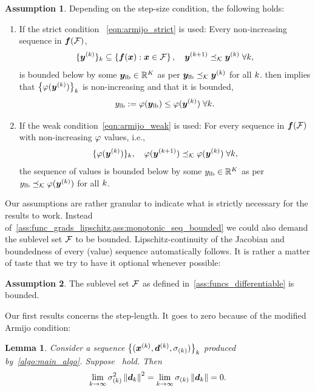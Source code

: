 \documentclass{article}
\theoremstyle{plain}
\newtheorem{lemma}[theorem]{Lemma}
\theoremstyle{definition}
\newtheorem{assumption}{Assumption}
\begin{document}
\begin{assumption}\label{ass:monotonic_seq_bounded}
	Depending on the step-size condition, the following holds:
	\begin{enumerate}
		\item 
			If the strict condition ~\eqref{eqn:armijo_strict} is used:
			Every non-increasing sequence in $\bm{f}(\mathcal F)$,
			$$
			\{\bm{y}^{(k)}\}_{k} \subseteq \left\{\bm{f}(\bm{x}): \bm{x}\in \mathcal F\right\},
			\quad \bm{y}^{(k+1)} \preceq_\mathcal K \bm{y}^{(k)} \;\forall k,
			$$
			is bounded below by some $\bm{y}_{\mathrm{lb}}\in \mathbb R^K$ as per
			$
			\bm{y}_{\mathrm{lb}} \preceq_\mathcal K \bm{y}^{(k)}
			$ for all $k$.
			 then implies that $\left\{\varphi(\bm{y}^{(k)})\right\}_k$
			is non-increasing and that it is bounded,
			$$
			{y}_{\mathrm{lb}} := \varphi(\bm{y}_{\mathrm{lb}})\leq \varphi(\bm{y}^{(k)})\; \forall k.
			$$
		\item If the weak condition~\eqref{eqn:armijo_weak} is used:
			For every sequence in $\bm{f}(\mathcal F)$
			with non-increasing $\varphi$ values, i.e.,
			$$
			\{\varphi(\bm{y}^{(k)})\}_{k},
			\quad \varphi(\bm{y}^{(k+1)}) \preceq_\mathcal K \varphi(\bm{y}^{(k)})\;\forall k,
			$$
			the sequence of values is bounded below by some ${y}_{\mathrm{lb}}\in \mathbb R^K$ as per
			$
			{y}_{\mathrm{lb}} \preceq_\mathcal K \varphi(\bm{y}^{(k)})
			$ for all $k$.
	\end{enumerate}
\end{assumption}

Our assumptions are rather granular to indicate what is strictly necessary for the results to
work.
Instead of~\cref{ass:func_grads_lipschitz,ass:monotonic_seq_bounded} we could also 
demand the sublevel set $\mathcal F$ to be bounded.
Lipschitz-continuity of the Jacobian and boundedness of every (value) sequence automatically 
follows.
It is rather a matter of taste that we try to have it optional whenever possible:
\begin{assumption}\label{ass:sublevelset_bounded}
	The sublevel set $\mathcal F$ as defined in~\cref{ass:funcs_differentiable} is bounded.
\end{assumption}

Our first results concerns the step-length.
It goes to zero because of the modified Armijo condition:
\begin{lemma}%
	\label{thm:stepNorm_zero}
	Consider a sequence $\left\{(\bm{x}^{(k)}, \bm{d}^{(k)}, \sigma_{(k)})\right\}_k$ produced by~\cref{algo:main_algo}.
	Suppose~ hold. 
	Then 
	\begin{equation*}
		\lim_{k\to \infty} \sigma_{(k)}^2 \left\|\bm{d}_k\right\|^2
		=
		\lim_{k\to \infty} \sigma_{(k)} \left\|\bm{d}_k\right\|
		= 
		0.
	\end{equation*}
\end{lemma}
\end{document}

